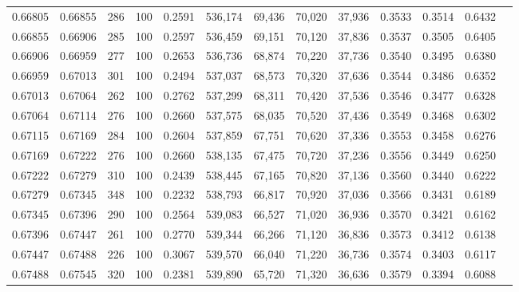 \begin{tabular}{rrrrrrrrrrrrr}
0.66805 & 0.66855 &   286 & 100 &                                     0.2591 & 536,174 &  69,436 &  70,020 &  37,936 & 0.3533 & 0.3514 & 0.6432 \\
0.66855 & 0.66906 &   285 & 100 &                                     0.2597 & 536,459 &  69,151 &  70,120 &  37,836 & 0.3537 & 0.3505 & 0.6405 \\
0.66906 & 0.66959 &   277 & 100 &                                     0.2653 & 536,736 &  68,874 &  70,220 &  37,736 & 0.3540 & 0.3495 & 0.6380 \\
0.66959 & 0.67013 &   301 & 100 &                                     0.2494 & 537,037 &  68,573 &  70,320 &  37,636 & 0.3544 & 0.3486 & 0.6352 \\
0.67013 & 0.67064 &   262 & 100 &                                     0.2762 & 537,299 &  68,311 &  70,420 &  37,536 & 0.3546 & 0.3477 & 0.6328 \\
0.67064 & 0.67114 &   276 & 100 &                                     0.2660 & 537,575 &  68,035 &  70,520 &  37,436 & 0.3549 & 0.3468 & 0.6302 \\
0.67115 & 0.67169 &   284 & 100 &                                     0.2604 & 537,859 &  67,751 &  70,620 &  37,336 & 0.3553 & 0.3458 & 0.6276 \\
0.67169 & 0.67222 &   276 & 100 &                                     0.2660 & 538,135 &  67,475 &  70,720 &  37,236 & 0.3556 & 0.3449 & 0.6250 \\
0.67222 & 0.67279 &   310 & 100 &                                     0.2439 & 538,445 &  67,165 &  70,820 &  37,136 & 0.3560 & 0.3440 & 0.6222 \\
0.67279 & 0.67345 &   348 & 100 &                                     0.2232 & 538,793 &  66,817 &  70,920 &  37,036 & 0.3566 & 0.3431 & 0.6189 \\
0.67345 & 0.67396 &   290 & 100 &                                     0.2564 & 539,083 &  66,527 &  71,020 &  36,936 & 0.3570 & 0.3421 & 0.6162 \\
0.67396 & 0.67447 &   261 & 100 &                                     0.2770 & 539,344 &  66,266 &  71,120 &  36,836 & 0.3573 & 0.3412 & 0.6138 \\
0.67447 & 0.67488 &   226 & 100 &                                     0.3067 & 539,570 &  66,040 &  71,220 &  36,736 & 0.3574 & 0.3403 & 0.6117 \\
0.67488 & 0.67545 &   320 & 100 &                                     0.2381 & 539,890 &  65,720 &  71,320 &  36,636 & 0.3579 & 0.3394 & 0.6088 \\

\end{tabular}

